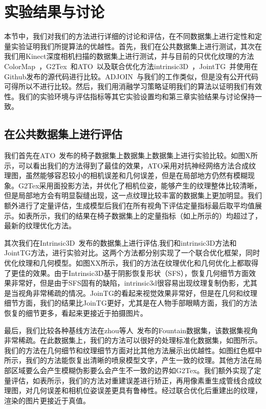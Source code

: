 \section{实验结果与讨论}
本节中，我们对我们的方法进行详细的讨论和评估，在不同数据集上进行定性和定量实验证明我们所提算法的优越性。首先，我们在公共数据集上进行测试，其次在我们用Kinect深度相机扫描的数据集上进行测试，并与目前的只优化纹理的方法ColorMap~\cite{zhou2014color}，G2Tex~\cite{fu2018texture}和ATO~\cite{JingweiHuang2020AdversarialTO}以及联合优化方法intrinsic3D~\cite{RobertMaier2017Intrinsic3DH3}，JointTG~\cite{YanpingFu2020JointTA}并使用在Github发布的源代码进行比较。ADJOIN~\cite{9705143}与我们的工作类似，但是没有公开代码可得所以不进行比较。然后，我们用消融学习策略证明我们的算法以证明我们有效性。我们的实验环境与评估指标等其它实验设置均和第三章实验结果与讨论保持一致。

\subsection{在公共数据集上进行评估}
我们首先在ATO~\cite{JingweiHuang2020AdversarialTO}发布的椅子数据集上数据集上数据集上进行实验比较。如图X所示，可以看出我们的方法得到了最佳的效果，ATO采用对抗神经网络方法合成纹理图，虽然能够容忍较小的相机误差和几何误差，但是在局部地方仍然有模糊现象。G2Tex采用面投影方法，并优化了相机位姿，能够产生的纹理整体比较清晰，但是局部地方会有明显裂缝出现，这一点纹理比较丰富的数据集上更加明显。我们额外进行了定量评估，生成模型后我们在所有视角下评估定量指标最后取平均值展示。如表所示，我们的结果在椅子数据集上的定量指标（如上所示的）均超过了，最新的纹理优化方法。\par
其次我们在Intrinsic3D~\cite{RobertMaier2017Intrinsic3DH3}发布的数据集上进行评估,我们和intrinsic3D方法和JointTG方法，进行实验对比。这两个方法都分别实现了一个联合优化框架，同时优化纹理和几何模型。如图XX所示，我们的方法在纹理优化和几何优化上都取得了更佳的效果。由于Intrinsic3D基于阴影恢复形状（SFS），恢复几何细节方面效果非常好，但是由于SFS固有的缺陷，intrinsic3d很容易出现纹理复制伪影，尤其是当视角非常稀疏的情况。JoinTG的看起来视觉效果非常好，但是在几何和纹理细节方面，我们的结果比JoinTG更好，尤其是在人物手部眼睛方面，我们的方法恢复的细节更多，看起来更接近于拍摄图片。\par
最后，我们比较各种基线方法在zhou等人~\cite{Zhou2018}发布的Fountain数据集，该数据集视角非常稀疏。在此数据集上，我们的方法可以很好的处理标准化数据集，如图所示。我们的方法在几何细节和纹理细节方面对比其他方法展示出优越性。如图红色框中所示，我们的方法能恢复出清晰的喷泉模型文字，产生一致的纹理。其他方法在局部区域要么会产生模糊伪影要么会产生不一致的边界如G2Tex。我们额外实现了定量评估，如表所示，我们的方法对重建误差进行矫正，再用像素重生成管线合成纹理图，对几何误差和相机位姿误差更具有鲁棒性。经过联合优化后重建出的纹理，渲染的图片更接近于真值。\par


